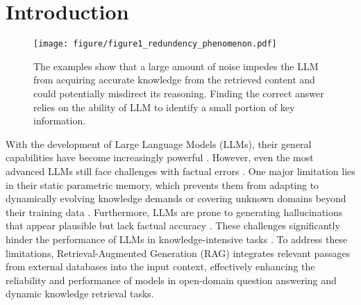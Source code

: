 \section{Introduction}

\begin{figure}[htbp!]
    \centering
    \texttt{[image: figure/figure1\_redundency\_phenomenon.pdf]}
    \caption{The examples show that a large amount of noise impedes the LLM from acquiring accurate knowledge from the retrieved content and could potentially misdirect its reasoning. Finding the correct answer relies on the ability of LLM to identify a small portion of key information.}
    \label{fig1:redundency phenomenon}
\end{figure}

With the development of Large Language Models (LLMs), their general capabilities have become increasingly powerful \cite{achiamGPT4TechnicalReport2023, dubey2024llama}. However, even the most advanced LLMs still face challenges with factual errors \cite{minFActScoreFinegrainedAtomic2023, huangFactAlignLongformFactuality2024}. One major limitation lies in their static parametric memory, which prevents them from adapting to dynamically evolving knowledge demands or covering unknown domains beyond their training data \cite{kasaiRealTimeQAWhats2023}. Furthermore, LLMs are prone to generating hallucinations that appear plausible but lack factual accuracy \cite{huangSurveyHallucinationLarge2024}. These challenges significantly hinder the performance of LLMs in knowledge-intensive tasks \cite{ramInContextRetrievalAugmentedLanguage2023}. To address these limitations, Retrieval-Augmented Generation (RAG) \cite{lewisRetrievalaugmentedGenerationKnowledgeintensive2020, xiongApproximateNearestNeighbor2020, izacardUnsupervisedDenseInformation2021} integrates relevant passages from external databases into the input context, effectively enhancing the reliability and performance of models in open-domain question answering and dynamic knowledge retrieval tasks. 

